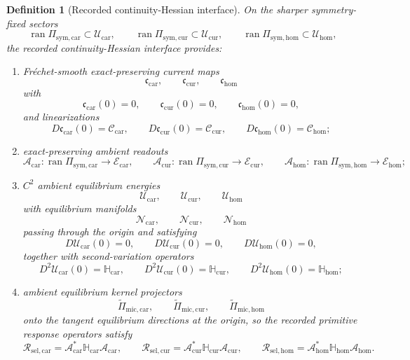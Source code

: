 \documentclass[11pt]{article}
\newcommand{\RootTensorClass}{\mathscr U_{\mathrm{car}}}
\newcommand{\RootRelabelClass}{\mathscr U_{\mathrm{cur}}}
\newcommand{\RootFreeClass}{\mathscr U_{\mathrm{hom}}}
\newcommand{\TensorSymProj}{\Pi_{\mathrm{sym,car}}}
\newcommand{\CurSymProj}{\Pi_{\mathrm{sym,cur}}}
\newcommand{\HomSymProj}{\Pi_{\mathrm{sym,hom}}}
\newcommand{\TensorCompat}{\mathcal C_{\mathrm{car}}}
\newcommand{\CurCompat}{\mathcal C_{\mathrm{cur}}}
\newcommand{\HomCompat}{\mathcal C_{\mathrm{hom}}}
\newcommand{\TensorCurrent}{\mathfrak c_{\mathrm{car}}}
\newcommand{\CurCurrent}{\mathfrak c_{\mathrm{cur}}}
\newcommand{\HomCurrent}{\mathfrak c_{\mathrm{hom}}}
\newcommand{\TensorResp}{\mathcal R_{\mathrm{sel,car}}}
\newcommand{\CurResp}{\mathcal R_{\mathrm{sel,cur}}}
\newcommand{\HomResp}{\mathcal R_{\mathrm{sel,hom}}}
\newcommand{\TensorEqClass}{\mathscr E_{\mathrm{car}}}
\newcommand{\CurEqClass}{\mathscr E_{\mathrm{cur}}}
\newcommand{\HomEqClass}{\mathscr E_{\mathrm{hom}}}
\newcommand{\TensorEqRead}{\mathcal A_{\mathrm{car}}}
\newcommand{\CurEqRead}{\mathcal A_{\mathrm{cur}}}
\newcommand{\HomEqRead}{\mathcal A_{\mathrm{hom}}}
\newcommand{\TensorAmbientHess}{\mathbb H_{\mathrm{car}}}
\newcommand{\CurAmbientHess}{\mathbb H_{\mathrm{cur}}}
\newcommand{\HomAmbientHess}{\mathbb H_{\mathrm{hom}}}
\newcommand{\TensorEqKerProj}{\widetilde\Pi_{\mathrm{mic,car}}}
\newcommand{\CurEqKerProj}{\widetilde\Pi_{\mathrm{mic,cur}}}
\newcommand{\HomEqKerProj}{\widetilde\Pi_{\mathrm{mic,hom}}}
\newcommand{\TensorAmbientEnergy}{\mathcal U_{\mathrm{car}}}
\newcommand{\CurAmbientEnergy}{\mathcal U_{\mathrm{cur}}}
\newcommand{\HomAmbientEnergy}{\mathcal U_{\mathrm{hom}}}
\newcommand{\TensorEqManifold}{\mathcal N_{\mathrm{car}}}
\newcommand{\CurEqManifold}{\mathcal N_{\mathrm{cur}}}
\newcommand{\HomEqManifold}{\mathcal N_{\mathrm{hom}}}
\newtheorem{definition}{Definition}
\begin{document}
\begin{definition}[Recorded continuity-Hessian interface]
\label{def:interface}
On the sharper symmetry-fixed sectors
\[
\operatorname{ran}\TensorSymProj\subset\RootTensorClass,\qquad
\operatorname{ran}\CurSymProj\subset\RootRelabelClass,\qquad
\operatorname{ran}\HomSymProj\subset\RootFreeClass,
\]
the recorded continuity-Hessian interface provides:
\begin{enumerate}
    \item Fr\'echet-smooth exact-preserving current maps
    \[
    \TensorCurrent,\qquad
    \CurCurrent,\qquad
    \HomCurrent
    \]
    with
    \begin{equation}
    \TensorCurrent(0)=0,\qquad
    \CurCurrent(0)=0,\qquad
    \HomCurrent(0)=0,
    \label{eq:current_zero}
    \end{equation}
    and linearizations
    \begin{equation}
    D\TensorCurrent(0)=\TensorCompat,\qquad
    D\CurCurrent(0)=\CurCompat,\qquad
    D\HomCurrent(0)=\HomCompat;
    \label{eq:current_linearization}
    \end{equation}
    \item exact-preserving ambient readouts
    \[
    \TensorEqRead:\operatorname{ran}\TensorSymProj\to\TensorEqClass,\qquad
    \CurEqRead:\operatorname{ran}\CurSymProj\to\CurEqClass,\qquad
    \HomEqRead:\operatorname{ran}\HomSymProj\to\HomEqClass;
    \]
    \item \(C^2\) ambient equilibrium energies
    \[
    \TensorAmbientEnergy,\qquad
    \CurAmbientEnergy,\qquad
    \HomAmbientEnergy
    \]
    with equilibrium manifolds
    \[
    \TensorEqManifold,\qquad
    \CurEqManifold,\qquad
    \HomEqManifold
    \]
    passing through the origin and satisfying
    \begin{equation}
    D\TensorAmbientEnergy(0)=0,\qquad
    D\CurAmbientEnergy(0)=0,\qquad
    D\HomAmbientEnergy(0)=0,
    \label{eq:energy_zero}
    \end{equation}
    together with second-variation operators
    \begin{equation}
    D^2\TensorAmbientEnergy(0)=\TensorAmbientHess,\qquad
    D^2\CurAmbientEnergy(0)=\CurAmbientHess,\qquad
    D^2\HomAmbientEnergy(0)=\HomAmbientHess;
    \label{eq:energy_hess}
    \end{equation}
    \item ambient equilibrium kernel projectors
    \[
    \TensorEqKerProj,\qquad
    \CurEqKerProj,\qquad
    \HomEqKerProj
    \]
    onto the tangent equilibrium directions at the origin, so the recorded primitive response operators satisfy
    \begin{equation}
    \TensorResp=\TensorEqRead^*\TensorAmbientHess\TensorEqRead,\qquad
    \CurResp=\CurEqRead^*\CurAmbientHess\CurEqRead,\qquad
    \HomResp=\HomEqRead^*\HomAmbientHess\HomEqRead.
    \label{eq:response}
    \end{equation}
\end{enumerate}
\end{definition}
\end{document}
